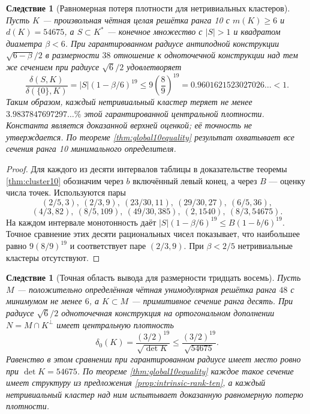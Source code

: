 \documentclass[11pt,a4paper]{article}
\newtheorem{corollary}[theorem]{Следствие}
\theoremstyle{remark}\newtheorem{remark}[theorem]{Замечание}
\begin{document}
\begin{corollary}[Равномерная потеря плотности для нетривиальных кластеров]
\label{cor:uniform-rank-ten-cluster-loss}
Пусть $K$ --- произвольная чётная целая решётка ранга 10 с $m(K)\ge6$ и $d(K)=54675$,
а $S\subset K^*$ --- конечное множество с $|S|>1$ и квадратом
диаметра $\beta<6$. При гарантированном радиусе антиподной конструкции
$\sqrt{6-\beta}/2$ в размерности $38$ отношение к одноточечной
конструкции над тем же сечением при радиусе $\sqrt6/2$ удовлетворяет
\[
 \frac{\delta(S,K)}{\delta(\{0\},K)}
 =|S|(1-\beta/6)^{19}
 \le 9\left(\frac89\right)^{19}
 =0.9601621523027026\ldots<1.
\]
Таким образом, каждый нетривиальный кластер теряет не менее
$3.9837847697297\ldots\%$ этой гарантированной центральной плотности.
Константа является доказанной верхней оценкой; её точность не утверждается.
По теореме \ref{thm:global10equality} результат охватывает все сечения ранга 10 минимального определителя.
\end{corollary}

\begin{proof}
Для каждого из десяти интервалов таблицы в доказательстве теоремы \ref{thm:cluster10}
обозначим через $b$ включённый левый конец, а через $B$ --- оценку
числа точек. Используются пары
\[
 (2/5,3),\ (2/3,9),\ (23/30,11),\ (29/30,27),\ (6/5,36),
\]
\[
 (4/3,82),\ (8/5,109),\ (49/30,385),\ (2,1540),\ (8/3,54675).
\]
На каждом интервале монотонность даёт
$|S|(1-\beta/6)^{19}\le B(1-b/6)^{19}$.
Точное сравнение этих десяти рациональных чисел показывает, что
наибольшее равно $9(8/9)^{19}$ и соответствует паре $(2/3,9)$.
При $\beta<2/5$ нетривиальные кластеры отсутствуют.
\end{proof}

\begin{corollary}[Точная область вывода для размерности тридцать восемь]
\label{cor:rank-ten-density-scope}
Пусть $M$ --- положительно определённая чётная унимодулярная решётка
ранга $48$ с минимумом не менее $6$, а $K\subset M$ --- примитивное
сечение ранга десять. При радиусе $\sqrt6/2$ одноточечная конструкция
на ортогональном дополнении $N=M\cap K^\perp$ имеет центральную плотность
\[
 \delta_0(K)=\frac{(3/2)^{19}}{\sqrt{\det K}}
 \le\frac{(3/2)^{19}}{\sqrt{54675}}.
\]
Равенство в этом сравнении при гарантированном радиусе имеет место
ровно при $\det K=54675$. По теореме \ref{thm:global10equality} каждое такое сечение имеет структуру из предложения \ref{prop:intrinsic-rank-ten},
а каждый нетривиальный кластер над ним испытывает доказанную
равномерную потерю плотности.
\end{corollary}
\end{document}
